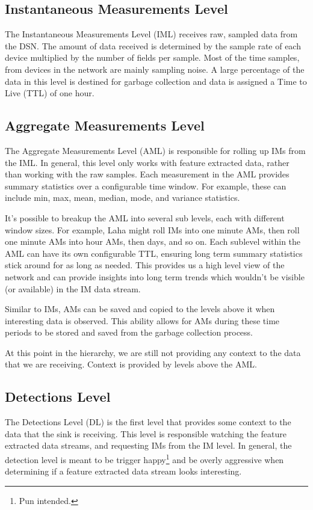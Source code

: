 \subsection{Instantaneous Measurements Level}
The Instantaneous Measurements Level (IML) receives raw, sampled data from the DSN. The amount of data received is determined by the sample rate of each device multiplied by the number of fields per sample. Most of the time samples, from devices in the network are mainly sampling noise. A large percentage of the data in this level is destined for garbage collection and data is assigned a Time to Live (TTL) of one hour. 

\subsection{Aggregate Measurements Level}
The Aggregate Measurements Level (AML) is responsible for rolling up IMs from the IML. In general, this level only works with feature extracted data, rather than working with the raw samples. Each measurement in the AML provides summary statistics over a configurable time window. For example, these can include min, max, mean, median, mode, and variance statistics. 

It's possible to breakup the AML into several sub levels, each with different window sizes. For example, Laha might roll IMs into one minute AMs, then roll one minute AMs into hour AMs, then days, and so on. Each sublevel within the AML can have its own configurable TTL, ensuring long term summary statistics stick around for as long as needed. This provides us a high level view of the network and can provide insights into long term trends which wouldn't be visible (or available) in the IM data stream.

Similar to IMs, AMs can be saved and copied to the levels above it when interesting data is observed. This ability allows for AMs during these time periods to be stored and saved from the garbage collection process.

At this point in the hierarchy, we are still not providing any context to the data that we are receiving. Context is provided by levels above the AML.

\subsection{Detections Level}
The Detections Level (DL) is the first level that provides some context to the data that the sink is receiving. This level is responsible watching the feature extracted data streams, and requesting IMs from the IM level. In general, the detection level is meant to be trigger happy\footnote{Pun intended.} and be overly aggressive when determining if a feature extracted data stream looks interesting. 

